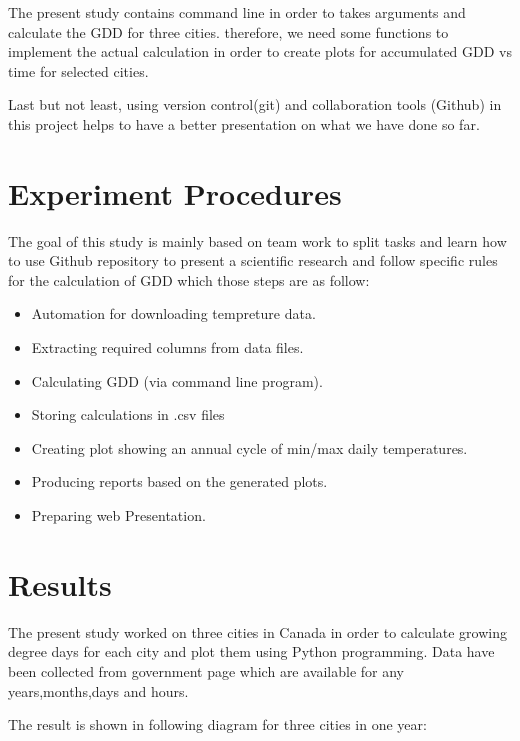 \documentclass[DIV=calc, paper=a4, fontsize=11pt, twocolumn]{scrartcl}
\begin{document}
The present study contains command line in order to takes arguments and calculate the GDD for three cities. therefore, we need some functions to implement the actual calculation in order to create plots for accumulated GDD vs time for selected cities.

Last but not least, using version control(git) and collaboration tools (Github) in this project helps to have a better presentation on what we have done so far.


\section{Experiment Procedures}
The goal of this study is mainly based on team work to split tasks and learn how to use Github repository to present a scientific research and follow specific rules for the calculation of GDD which those steps are as follow:

\begin{itemize}
\item Automation for downloading tempreture data.
\item Extracting required columns from data files.
\item Calculating GDD (via command line program).
\item Storing calculations in .csv files
\item Creating plot showing an annual cycle of min/max daily temperatures.
\item Producing reports based on the generated plots.
\item Preparing web Presentation.
\end{itemize}
\section{Results}
The present study worked on three cities in Canada in order to calculate growing degree days for each city and plot them using Python programming. Data have been collected from government page which are available for any years,months,days and hours. 

The result is shown in following diagram for three cities in one year:
\end{document}

